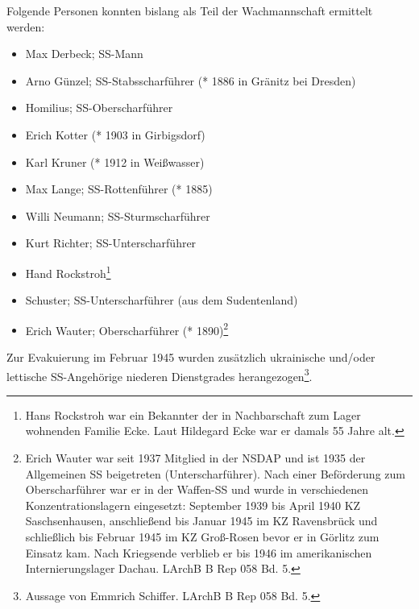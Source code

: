 Folgende Personen konnten bislang als Teil der Wachmannschaft ermittelt werden:
\begin{itemize}
\item Max Derbeck; SS-Mann

\item Arno Günzel; SS-Stabsscharführer (* 1886 in Gränitz bei Dresden)%

\item Homilius; SS-Oberscharführer

\item Erich Kotter (* 1903 in Girbigsdorf)

\item Karl Kruner (* 1912 in Weißwasser)%

\item Max Lange; SS-Rottenführer (* 1885)%

\item Willi Neumann; SS-Sturmscharführer

\item Kurt Richter; SS-Unterscharführer

\item Hand Rockstroh\footnote{Hans Rockstroh war ein Bekannter der in Nachbarschaft zum Lager wohnenden Familie Ecke. Laut Hildegard Ecke war er damals 55 Jahre alt.}

\item Schuster; SS-Unterscharführer (aus dem Sudentenland)

\item Erich Wauter; Oberscharführer (* 1890)\footnote{Erich Wauter war seit 1937 Mitglied in der NSDAP und ist 1935 der Allgemeinen SS beigetreten (Unterscharführer). Nach einer Beförderung zum Oberscharführer war er in der Waffen-SS und wurde in verschiedenen Konzentrationslagern eingesetzt: September 1939 bis April 1940 KZ Saschsenhausen, anschließend bis Januar 1945 im KZ Ravensbrück und schließlich bis Februar 1945 im KZ Groß-Rosen bevor er in Görlitz zum Einsatz kam. Nach Kriegsende verblieb er bis 1946 im amerikanischen Internierungslager Dachau. LArchB B Rep 058 Bd. 5.}

\end{itemize}

Zur Evakuierung im Februar 1945 wurden zusätzlich ukrainische und/oder lettische SS-Angehörige niederen Dienstgrades herangezogen\footnote{Aussage von Emmrich Schiffer. LArchB B Rep 058 Bd. 5.}.

